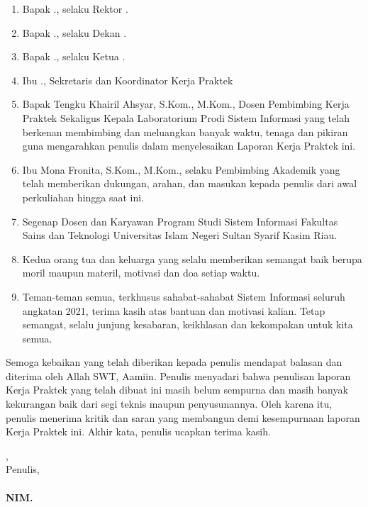 \begin{enumerate}
	\item Bapak \rektor., selaku Rektor \universitas.
	\item Bapak \dekan., selaku Dekan \fakultas.
	\item Bapak \kaprodi., selaku Ketua \programStudi \space
	      \fakultas \space \universitas.
	\item Ibu \sekretarisprodi., Sekretaris dan Koordinator Kerja Praktek \programStudi \space
	      \fakultas \space \universitas
	\item Bapak Tengku Khairil Ahsyar, S.Kom., M.Kom., Dosen Pembimbing Kerja Praktek Sekaligus Kepala Laboratorium Prodi Sistem Informasi yang telah berkenan membimbing dan meluangkan banyak waktu, tenaga dan pikiran guna mengarahkan penulis dalam menyelesaikan Laporan Kerja Praktek ini.
	\item Ibu Mona Fronita, S.Kom., M.Kom., selaku Pembimbing Akademik yang telah memberikan dukungan, arahan, dan masukan kepada penulis dari awal perkuliahan hingga saat ini.
	\item Segenap Dosen dan Karyawan Program Studi Sistem Informasi Fakultas Sains dan Teknologi Universitas Islam Negeri Sultan Syarif Kasim Riau.
	\item Kedua orang tua dan keluarga yang selalu memberikan semangat baik berupa moril maupun materil, motivasi dan doa setiap waktu.
	\item Teman-teman semua, terkhusus sahabat-sahabat Sistem Informasi seluruh angkatan 2021, terima kasih atas bantuan dan motivasi kalian. Tetap semangat, selalu junjung kesabaran, keikhlasan dan kekompakan untuk kita semua.

\end{enumerate}

Semoga kebaikan yang telah diberikan kepada penulis mendapat balasan dan diterima oleh Allah SWT, Aamiin. Penulis menyadari bahwa penulisan laporan Kerja Praktek yang telah dibuat ini masih belum sempurna dan masih banyak kekurangan baik dari segi teknis maupun penyusunannya. Oleh karena itu, penulis menerima kritik dan saran yang membangun demi kesempurnaan laporan Kerja Praktek ini. Akhir kata, penulis ucapkan terima kasih.

\vspace*{0.1cm}

\begin{flushright}
	\kota, \tanggalPersetujuan\\
	Penulis,\\
	\vspace{2cm}
	\textbf{\underline{\penulis}\\
		NIM. \nim}

\end{flushright}

